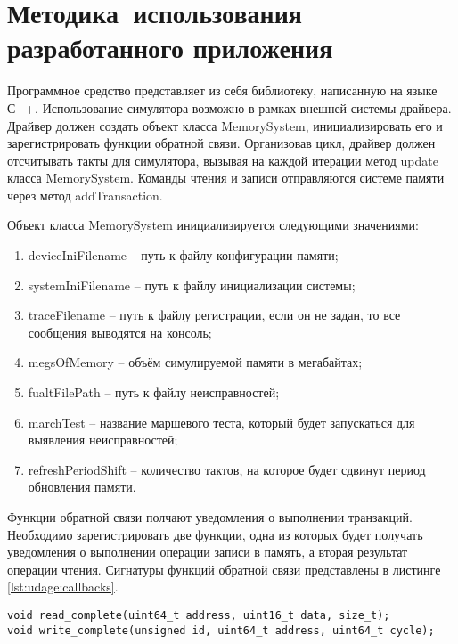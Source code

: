 \section{Методика~использования разработанного приложения}
\label{sec:usage}

Программное средство представляет из себя библиотеку, написанную на языке С++. Использование симулятора возможно в рамках внешней системы-драйвера. Драйвер должен создать объект класса MemorySystem, инициализировать его и зарегистрировать функции обратной связи. Организовав цикл, драйвер должен отсчитывать такты для симулятора, вызывая на каждой итерации метод update класса MemorySystem. Команды чтения и записи отправляются системе памяти через метод addTransaction.

Объект класса MemorySystem инициализируется следующими значениями:

\begin{enumerate}
\item deviceIniFilename -- путь к файлу конфигурации памяти;
\item systemIniFilename -- путь к файлу инициализации системы;
\item traceFilename -- путь к файлу регистрации, если он не задан, то все сообщения выводятся на консоль;
\item megsOfMemory -- объём симулируемой памяти в мегабайтах;
\item fualtFilePath -- путь к файлу неисправностей;
\item marchTest -- название маршевого теста, который будет запускаться для выявления неисправностей;
\item refreshPeriodShift -- количество тактов, на которое будет сдвинут период обновления памяти.
\end{enumerate}

Функции обратной связи полчают уведомления о выполнении транзакций. Необходимо зарегистрировать две функции, одна из которых будет получать уведомления о выполнении операции записи в память, а вторая результат операции чтения. Сигнатуры функций обратной связи представлены в листинге \ref{lst:udage:callbacks}.

\begin{lstlisting}[style=cplusplusstyle, caption={Сигнатуры функций обратного вызова}, label=lst:udage:callbacks]
void read_complete(uint64_t address, uint16_t data, size_t);
void write_complete(unsigned id, uint64_t address, uint64_t cycle);
\end{lstlisting}

